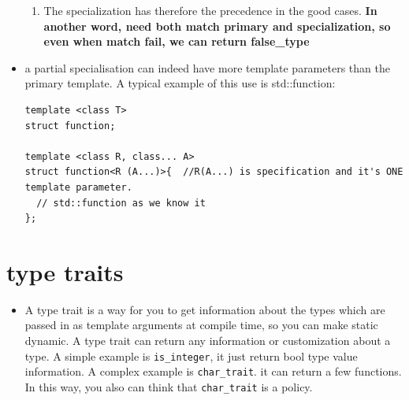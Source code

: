 \documentclass[a4paper,11pt,twoside]{book}
\begin{document}
\begin{itemize}
\begin{enumerate}
	\item The specialization has therefore the precedence in the good cases. \textbf{In another word, need both match primary and specialization, so even when match fail, we can return false\_type}

\end{enumerate}



\item a partial specialisation can indeed have more template parameters than the primary template. A typical example of this use is std::function: 
\begin{lstlisting}
template <class T>
struct function;

template <class R, class... A>
struct function<R (A...)>{  //R(A...) is specification and it's ONE template parameter.
  // std::function as we know it
};
\end{lstlisting}	

\end{itemize}

\section{type traits}

\begin{itemize}
	\item A type trait is a way for you to get information about the types which are passed in as template arguments at compile time, so you can make static dynamic. A type trait can return any information or customization about a type. A simple example is \texttt{is\_integer}, it just return bool type value information. A complex example is \texttt{char\_trait}. it can return a few functions. In this way, you also can think that \texttt{char\_trait} is a policy. 
	
\end{itemize}
\end{document}
